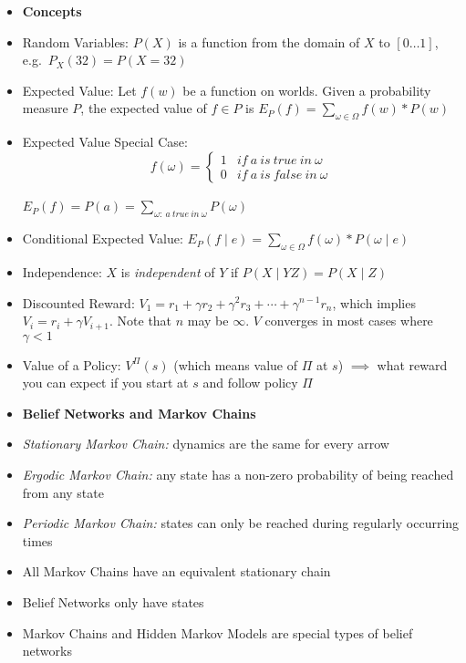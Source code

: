 \documentclass[11pt,landscape]{memoir}
\begin{document}
\begin{multicols}{2}
\begin{itemize}
    \item \textbf{Concepts}
    \item Random Variables: $P(X)$ is a function from the domain of $X$ to $[0 \ldots 1]$, e.g.\ $P_X(32) = P(X=32)$
    \item Expected Value: Let $f(w)$ be a function on worlds. Given a probability measure $P$, the expected value of $f \in P$ is $E_P(f) = \sum_{\omega \in \Omega} f(w) * P(w)$
    \item Expected Value Special Case: \\
        \[ f(\omega) =
        \begin{cases}
            1 & if\ a\ is\ true\ in\ \omega \\
            0 & if\ a\ is\ false\ in\ \omega
        \end{cases}
        \] \\
        $E_P(f) = P(a) = \sum_{\omega:\ a\ true\ in\ \omega} P(\omega)$
    \item Conditional Expected Value: $E_P(f \mid e) = \sum_{\omega \in \Omega} f(\omega) * P(\omega \mid e)$
    \item Independence: $X$ is \textit{independent} of $Y$ if $P(X \mid YZ) = P(X \mid Z)$
    \item Discounted Reward: $V_1 = r_1 + \gamma r_2 + \gamma^2 r_3 + \cdots + \gamma^{n-1} r_n$, which implies $V_i = r_i + \gamma V_{i+1}$. Note that $n$ may be $\infty$. $V$ converges in most cases where $\gamma < 1$
    \item Value of a Policy: $V^{\Pi}(s)$ (which means value of $\Pi$ at $s$) $\implies$ what reward you can expect if you start at $s$ and follow policy $\Pi$
\end{itemize}

\begin{itemize}
    \item \textbf{Belief Networks and Markov Chains}
    \item \textit{Stationary Markov Chain:} dynamics are the same for every arrow
    \item \textit{Ergodic Markov Chain:} any state has a non-zero probability of being reached from any state
    \item \textit{Periodic Markov Chain:} states can only be reached during regularly occurring times
    \item All Markov Chains have an equivalent stationary chain
    \item Belief Networks only have states
    \item Markov Chains and Hidden Markov Models are special types of belief networks
\end{itemize}


\end{multicols}
\end{document}
